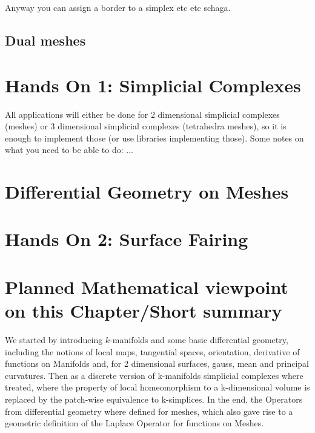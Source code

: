 Anyway you can assign a border to a simplex etc etc schaga.
\subsection{Dual meshes}

\section{Hands On 1: Simplicial Complexes}
\label{sec::2_handsOnSimplicialComplexes}

All applications will either be done for 2 dimensional simplicial complexes (meshes) or 3 dimensional simplicial complexes (tetrahedra meshes), so it is enough to implement those (or use libraries implementing those). Some notes on what you need to be able to do: ...


\section{Differential Geometry on Meshes}


\section{Hands On 2: Surface Fairing}



\section{Planned Mathematical viewpoint on this Chapter/Short summary}
		We started by introducing $k$-manifolds and  some basic differential geometry, including the notions of local maps, tangential spaces, orientation, derivative of functions on Manifolds and, for 2 dimensional surfaces, gauss, mean and principal curvatures. Then as a discrete version of k-manifolds simplicial complexes where treated, where the property of local homeomorphism to a k-dimensional volume is replaced by the patch-wise equivalence to k-simplices. In the end, the Operators from differential geometry where defined for meshes, which also gave rise to a geometric definition of the Laplace Operator for functions on Meshes.

